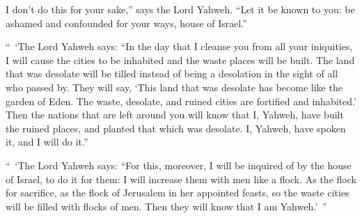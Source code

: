 {I don’t do this for your sake,” says the Lord Yahweh. “Let it be known to you: be ashamed and confounded for your ways, house of Israel.”
\par }{\PP {}“ ‘The Lord Yahweh says: “In the day that I cleanse you from all your iniquities, I will cause the cities to be inhabited and the waste places will be built.
The land that was desolate will be tilled instead of being a desolation in the sight of all who passed by.
They will say, ‘This land that was desolate has become like the garden of Eden. The waste, desolate, and ruined cities are fortified and inhabited.’
Then the nations that are left around you will know that I, Yahweh, have built the ruined places, and planted that which was desolate. I, Yahweh, have spoken it, and I will do it.”
\par }{\PP {}“ ‘The Lord Yahweh says: “For this, moreover, I will be inquired of by the house of Israel, to do it for them: I will increase them with men like a flock.
As the flock for sacrifice, as the flock of Jerusalem in her appointed feasts, so the waste cities will be filled with flocks of men. Then they will know that I am Yahweh.’ ”

}
